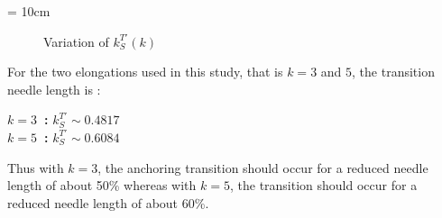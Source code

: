 \picW = 10cm
\begin{figure}
        \centering
	\caption{Variation of $k_S^{T\prime}(k)$}
	\label{fig:LnT-k}
\end{figure}


For the two elongations used in this study, that is $k=3$ and $5$, the transition needle length is :
\begin{center}
	\textbf{$k=3$~:} $k_S^{T\prime} \sim 0.4817$	\\
	\textbf{$k=5$~:} $k_S^{T\prime} \sim 0.6084$	\\
\end{center}
%
Thus with $k=3$, the anchoring transition should occur for a reduced needle length of about 50\% 
whereas with $k=5$, the transition should occur for a reduced needle length of about 60\%.





